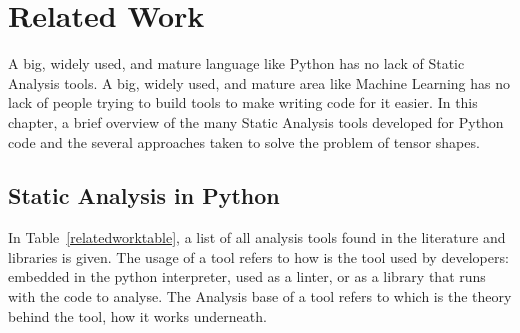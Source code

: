 \chapter{Related Work}\label{related-work}

A big, widely used, and mature language like Python has no lack of Static Analysis tools.
A big, widely used, and mature area like Machine Learning has no lack of people trying to
build tools to make writing code for it easier. In this chapter, a brief overview of the
many Static Analysis tools developed for Python code and the several approaches taken to
solve the problem of tensor shapes.

\section{Static Analysis in Python}


In Table~\ref{relatedworktable}, a list of all analysis tools found in the literature
and libraries is given. The usage of a tool refers to how is the tool used by developers:
embedded in the python interpreter, used as a linter, or as a library that runs with the
code to analyse. The Analysis base of a tool refers to which is the theory behind the
tool, how it works underneath.


